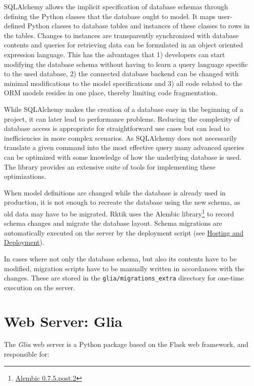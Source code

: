 SQLAlchemy allows the implicit specification of database schemas through
defining the Python classes that the database ought to model. It maps
user-defined Python classes to database tables and instances of these
classes to rows in the tables. Changes to instances are transparently
synchronized with database contents and queries for retrieving data can
be formulated in an object oriented expression language. This has the
advantages that 1) developers can start modifying the database schema
without having to learn a query language specific to the used database,
2) the connected database backend can be changed with minimal
modifications to the model specifications and 3) all code related to the
ORM models resides in one place, thereby limiting code fragmentation.

While SQLAlchemy makes the creation of a database easy in the beginning
of a project, it can later lead to performance problems. Reducing the
complexity of database access is appropriate for straightforward use
cases but can lead to inefficiencies in more complex scenarios. As
SQLAlchemy does not necessarily translate a given command into the most
effective query many advanced queries can be optimized with some
knowledge of how the underlying database is used. The library provides
an extensive suite of tools for implementing these optimizations.

When model definitions are changed while the database is already used in
production, it is not enough to recreate the database using the new
schema, as old data may have to be migrated. Rktik uses the Alembic
library\footnote{\href{https://pypi.python.org/pypi/alembic/0.7.5.post2}{Alembic
  0.7.5.post.2}} to record schema changes and migrate the database
layout. Schema migrations are automatically executed on the server by
the deployment script (see \hyperref[hosting-and-deployment]{Hosting and
Deployment}).

In cases where not only the database schema, but also its contents have
to be modified, migration scripts have to be manually written in
accordances with the changes. These are stored in the
\texttt{glia/migrations\_extra} directory for one-time execution on the
server.

\section{Web Server: Glia}\label{web-server-glia}

The \emph{Glia} web server is a Python package based on the Flask web
framework, and responsible for:

